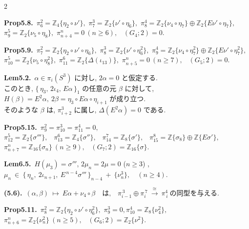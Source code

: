 \documentclass[10pt, leqno]{ltjsarticle}
\newcommand{\todai}[2][]{\{\,#2\,\}_{#1}}      %
\newcommand{\gen}[1]{\{#1\}}       %
\numberwithin{equation}{section}
\theoremstyle{plain}
\theoremstyle{definition}
\theoremstyle{remark}
\begin{document}
\begin{paracol}{2}
\switchcolumn

\noindent
\textbf{Prop5.8.}\
\(\pi^{2}_{6}=\mathbb Z_4\gen{\eta_{2}\circ\nu'},\) \quad
\(\pi^{3}_{7}=\mathbb Z_2\gen{\nu'\circ\eta_6},\) \quad
\(\pi^{4}_{8}=\mathbb Z_2\gen{\nu_{4}\circ\eta_7}\oplus \mathbb Z_2\gen{E\nu'\circ\eta_7},\) \\
\(\pi^{5}_{9}=\mathbb Z_2\gen{\nu_{5}\circ\eta_8},\) \quad
\(\pi^{n}_{n+4}=0\ (n\ge6),\) \
\((G_{4};2)=0.\)

\noindent
\textbf{Prop5.9.}\
\(\pi^{2}_{7}=\mathbb Z_2\gen{\eta_{2}\circ\nu'\circ\eta_6},\) \quad
\(\pi^{3}_{8}=\mathbb Z_2\gen{\nu'\circ\eta_6^2},\) \quad
\(\pi^{4}_{9}=\mathbb Z_2\gen{\nu_{4}\circ\eta_7^2}\oplus \mathbb Z_2\gen{E\nu'\circ\eta_7^2},\) \\
\(\pi^{5}_{10}=\mathbb Z_2\gen{\nu_{5}\circ\eta_8^2},\) \quad
\(\pi^{6}_{11}=\mathbb Z_2\gen{\Delta(\iota_{13})},\) \quad
\(\pi^{n}_{n+5}=0\ (n\ge7),\) \
\((G_{5};2)=0.\)

\noindent
\textbf{Lem5.2.}\
\(\alpha\in\pi_{i}(S^{3})\) に対し,
\(2\alpha=0\) と仮定する. \\
このとき,
\(\todai[1]{\eta_3,\,2\iota_4,\,E\alpha}\) 
の任意の元 \(\beta\) に対して,\\
\(
H(\beta)=E^{2}\alpha,\
2\beta=\eta_3\circ E\alpha\circ \eta_{i+1}
\)
が成り立つ. \\
そのような \(\beta\) は,
\(\pi^{3}_{i+2}\) に属し, \(\Delta(E^{2}\alpha)=0\) である. 

\noindent
\textbf{Prop5.15.}\
\(\pi_9^2=\pi_{10}^3=\pi_{11}^4=0,\) \\
\(\pi^{5}_{12}=\mathbb Z_2\gen{\sigma'''},\) \
\(\pi^{6}_{13}=\mathbb Z_4\gen{\sigma''},\) \
\(\pi^{7}_{14}=\mathbb Z_8\gen{\sigma'},\) \
\(\pi^{8}_{15}=\mathbb Z\gen{\sigma_8}\oplus\mathbb Z\gen{E\sigma'},\) \\
\(\pi^{n}_{n+7}=\mathbb Z_{16}\gen{\sigma_n}\ (n\ge9),\) \
\((G_{7};2)=\mathbb Z_{16}\gen{\sigma}.\)

\noindent
\textbf{Lem6.5.}\
\(H(\mu_{3})=\sigma'''\), \quad
\(2\mu_{n}=2\mu=0\) (\(n\ge3\)) , \\
\(
\mu_{n}\ \in\ \todai[n-4]{\eta_{n},\ 2\iota_{n+1},\ E^{\,n-4}\sigma'''}
\ +\ \gen{\nu^{3}_{n}},
\quad (n\ge4).
\)

\noindent
\textbf{(5.6).}\
\((\alpha,\beta)\ \longmapsto\ E\alpha+\nu_{4}\circ\beta
\quad\text{は,}\quad
\pi^{\,3}_{i-1}\oplus \pi^{\,7}_{i}\ \xrightarrow{\ \cong\ }\ \pi_{\,i}^{4}
\ \text{の同型を与える. }\)

\noindent
\textbf{Prop5.11.}\
\(\pi^{2}_{8}=\mathbb Z_2\gen{\eta_{2}\circ\nu'\circ\eta_6^2},\)\quad 
\(\pi^{3}_{9}=0,\)\quad \(\pi^{4}_{10}=\mathbb Z_8\gen{\nu_{4}^2},\) \\
\(\pi^{n}_{n+6}=\mathbb Z_2\gen{\nu_n^2}\ (n\ge5),\) \
\((G_{6};2)=\mathbb Z_2\gen{\nu^2}.\)


\end{paracol}
\end{document}
